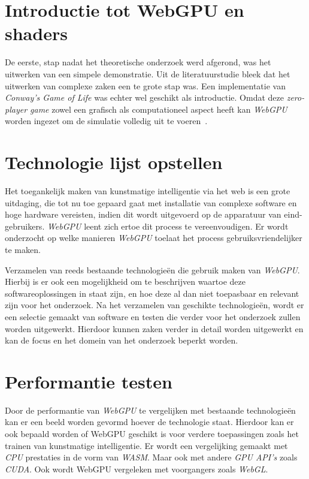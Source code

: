 \break{}

\section{Introductie tot WebGPU en shaders}

De eerste, stap nadat het theoretische onderzoek werd afgerond, was het uitwerken van een simpele demonstratie. Uit de literatuurstudie bleek dat het uitwerken van complexe zaken een te grote stap was. Een implementatie van \textit{Conway's Game of Life} was echter wel geschikt als introductie. Omdat deze 
\textit{zero-player game} zowel een grafisch als computationeel aspect heeft kan \textit{WebGPU} worden ingezet om de simulatie volledig uit te voeren~\autocite{google2023}.

\section{Technologie lijst opstellen}

Het toegankelijk maken van kunstmatige intelligentie via het web is een grote uitdaging, die tot nu toe gepaard gaat met installatie van complexe software en hoge hardware vereisten, indien dit wordt uitgevoerd op de apparatuur van eind-gebruikers. \textit{WebGPU} leent zich ertoe dit process te vereenvoudigen. Er wordt onderzocht op welke manieren \textit{WebGPU} toelaat het process gebruiksvriendelijker te maken. 

\bigbreak{}

Verzamelen van reeds bestaande technologieën die gebruik maken van \textit{WebGPU}. Hierbij is er ook een mogelijkheid om te beschrijven waartoe deze softwareoplossingen in staat zijn, en hoe deze al dan niet toepasbaar en relevant zijn voor het onderzoek. Na het verzamelen van geschikte technologieën, wordt er een selectie gemaakt van software en testen die verder voor het onderzoek zullen worden uitgewerkt. Hierdoor kunnen zaken verder in detail worden uitgewerkt en kan de focus en het domein van het onderzoek beperkt worden.

\section{Performantie testen}

Door de performantie van \textit{WebGPU} te vergelijken met bestaande technologieën kan er een beeld worden gevormd hoever de technologie staat. Hierdoor kan er ook bepaald worden of WebGPU geschikt is voor verdere toepassingen zoals het trainen van kunstmatige intelligentie. Er wordt een vergelijking gemaakt met \textit{CPU} prestaties in de vorm van \textit{WASM}. Maar ook met andere \textit{GPU API's} zoals \textit{CUDA}. Ook wordt WebGPU vergeleken met voorgangers zoals \textit{WebGL}.

